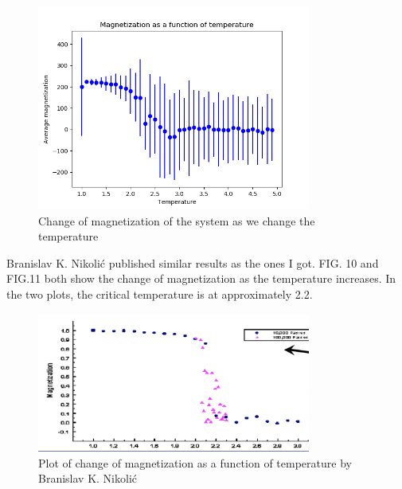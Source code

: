 \documentclass[aps,twocolumn,twoside,secnumarabic,balancelastpage,amsmath,amssymb,nofootinbib,hyperref=pdftex]{revtex4}
\begin{document}
\begin{figure}[htb]
\includegraphics[width=9cm]{M_Temperature.png}	
\caption{Change of magnetization of the system as we change the temperature}
\end{figure}
\par Branislav K. Nikolić published similar results as the ones I got. FIG. 10 and FIG.11 both show the change of magnetization as the temperature increases. In the two plots, the critical temperature is at approximately 2.2. 
\begin{figure}[htb]
\includegraphics[width=9cm]{test.png}	
\caption{Plot of change of magnetization as a function of temperature by Branislav K. Nikolić}
\end{figure}
\end{document}
